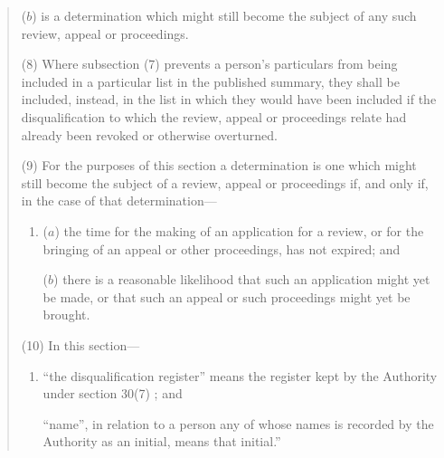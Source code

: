 \documentclass[12pt,a4paper]{article}
\begin{document}
\begin{quotation}
\begin{enumerate}
($b$) is a determination which might still become the subject of any such review, appeal or proceedings.
\end{enumerate}

(8) Where subsection (7)  prevents a person’s particulars from being included in a particular list in the published summary, they shall be included, instead, in the list in which they would have been included if the disqualification to which the review, appeal or proceedings relate had already been revoked or otherwise overturned.

(9) For the purposes of this section a determination is one which might still become the subject of a review, appeal or proceedings if, and only if, in the case of that determination—
\begin{enumerate}\item[]
($a$) the time for the making of an application for a review, or for the bringing of an appeal or other proceedings, has not expired; and

($b$) there is a reasonable likelihood that such an application might yet be made, or that such an appeal or such proceedings might yet be brought.
\end{enumerate}

(10) In this section—
\begin{enumerate}\item[]
    “the disqualification register” means the register kept by the Authority under section 30(7) ; and

    “name”, in relation to a person any of whose names is recorded by the Authority as an initial, means that initial.” 
\end{enumerate}
\end{quotation}
\end{document}
